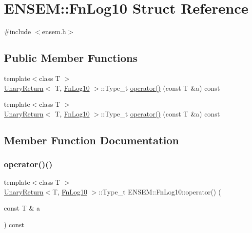 \hypertarget{structENSEM_1_1FnLog10}{}\section{E\+N\+S\+EM\+:\+:Fn\+Log10 Struct Reference}
\label{structENSEM_1_1FnLog10}


{\ttfamily \#include $<$ensem.\+h$>$}

\subsection*{Public Member Functions}
\begin{DoxyCompactItemize}
\item 
{\footnotesize template$<$class T $>$ }\\\mbox{\hyperlink{structENSEM_1_1UnaryReturn}{Unary\+Return}}$<$ T, \mbox{\hyperlink{structENSEM_1_1FnLog10}{Fn\+Log10}} $>$\+::Type\+\_\+t \mbox{\hyperlink{structENSEM_1_1FnLog10_a391be0578edd7ffb0348e9dd601e8323}{operator()}} (const T \&a) const
\item 
{\footnotesize template$<$class T $>$ }\\\mbox{\hyperlink{structENSEM_1_1UnaryReturn}{Unary\+Return}}$<$ T, \mbox{\hyperlink{structENSEM_1_1FnLog10}{Fn\+Log10}} $>$\+::Type\+\_\+t \mbox{\hyperlink{structENSEM_1_1FnLog10_a391be0578edd7ffb0348e9dd601e8323}{operator()}} (const T \&a) const
\end{DoxyCompactItemize}


\subsection{Member Function Documentation}
\mbox{\label{structENSEM_1_1FnLog10_a391be0578edd7ffb0348e9dd601e8323}} 
\subsubsection{\texorpdfstring{operator()()}{operator()()}\hspace{0.1cm}{\footnotesize\ttfamily [1/2]}}
{\footnotesize\ttfamily template$<$class T $>$ \\
\mbox{\hyperlink{structENSEM_1_1UnaryReturn}{Unary\+Return}}$<$T, \mbox{\hyperlink{structENSEM_1_1FnLog10}{Fn\+Log10}} $>$\+::Type\+\_\+t E\+N\+S\+E\+M\+::\+Fn\+Log10\+::operator() (\begin{DoxyParamCaption}\item[{const T \&}]{a }\end{DoxyParamCaption}) const\hspace{0.3cm}{\ttfamily [inline]}}

